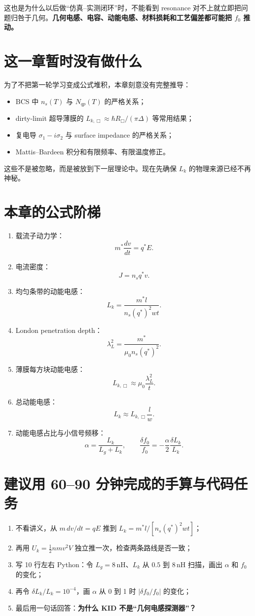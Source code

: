 \documentclass[11pt,a4paper,openany]{ctexrep}
\begin{document}
这也是为什么以后做“仿真--实测闭环”时，不能看到 resonance 对不上就立即把问题归咎于几何。\textbf{几何电感、电容、动能电感、材料损耗和工艺偏差都可能把 $f_0$ 推动。}

\section{这一章暂时没有做什么}
为了不把第一轮学习变成公式堆积，本章刻意没有完整推导：
\begin{itemize}
  \item BCS 中 $n_s(T)$ 与 $N_{qp}(T)$ 的严格关系；
  \item dirty-limit 超导薄膜的 $L_{k,\Box}\approx\hbar R_\Box/(\pi\Delta)$ 等常用结果；
  \item 复电导 $\sigma_1-i\sigma_2$ 与 surface impedance 的严格关系；
  \item Mattis--Bardeen 积分和有限频率、有限温度修正。
\end{itemize}
这些不是被忽略，而是被放到下一层理论中。现在先确保 $L_k$ 的物理来源已经不再神秘。

\section{本章的公式阶梯}
\begin{enumerate}
  \item 载流子动力学：
  \[
  m^*\frac{dv}{dt}=q^*E.
  \]
  \item 电流密度：
  \[
  J=n_sq^*v.
  \]
  \item 均匀条带的动能电感：
  \[
  \boxed{L_k=\frac{m^*l}{n_s(q^*)^2wt}}.
  \]
  \item London penetration depth：
  \[
  \boxed{\lambda_L^2=\frac{m^*}{\mu_0n_s(q^*)^2}}.
  \]
  \item 薄膜每方块动能电感：
  \[
  \boxed{L_{k,\Box}\approx\mu_0\frac{\lambda_L^2}{t}}.
  \]
  \item 总动能电感：
  \[
  L_k\approx L_{k,\Box}\frac{l}{w}.
  \]
  \item 动能电感占比与小信号频移：
  \[
  \boxed{\alpha=\frac{L_k}{L_g+L_k}},\qquad
  \boxed{\frac{\delta f_0}{f_0}=-\frac{\alpha}{2}\frac{\delta L_k}{L_k}}.
  \]
\end{enumerate}

\section{建议用 60--90 分钟完成的手算与代码任务}
\begin{enumerate}
  \item 不看讲义，从 $m\,dv/dt=qE$ 推到 $L_k=m^*l/[n_s(q^*)^2wt]$；
  \item 再用 $U_k=\tfrac12nmv^2V$ 独立推一次，检查两条路线是否一致；
  \item 写 10 行左右 Python：令 $L_g=8\,\mathrm{nH}$、$L_k$ 从 $0.5$ 到 $8\,\mathrm{nH}$ 扫描，画出 $\alpha$ 和 $f_0$ 的变化；
  \item 再令 $\delta L_k/L_k=10^{-4}$，画 $\alpha$ 从 0 到 1 时 $|\delta f_0/f_0|$ 的变化；
  \item 最后用一句话回答：\textbf{为什么 KID 不是“几何电感探测器”？}
\end{enumerate}
\end{document}
